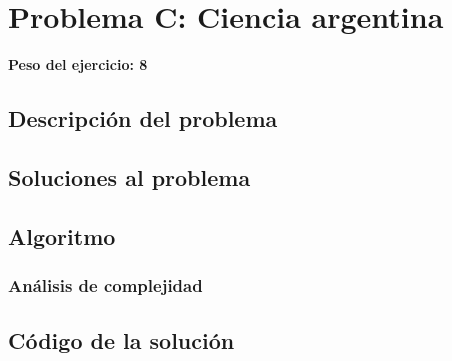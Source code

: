 \newpage{}
\section{Problema C: Ciencia argentina}
\textbf{Peso del ejercicio: 8}
\subsection{Descripción del problema}

\subsection{Soluciones al problema}

\subsection{Algoritmo}

\subsubsection*{Análisis de complejidad}

\newpage
\subsection{Código de la solución}

